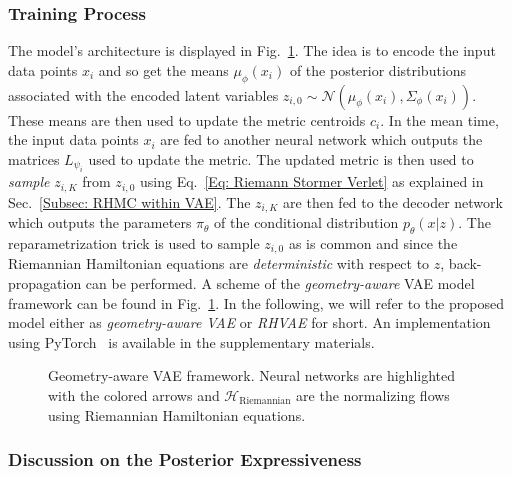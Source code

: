 \documentclass[10pt,journal,compsoc]{IEEEtran}
\begin{document}
    \subsubsection{Training Process}
    The model's architecture is displayed in Fig.~\ref{Fig: RHVAE framework}. The idea is to encode the input data points $x_i$ and so get the means $\mu_{\phi}(x_i)$ of the posterior distributions associated with the encoded latent variables $z_{i, 0} \sim \mathcal{N}(\mu_{\phi}(x_i), \Sigma_{\phi}(x_i))$. These means are then used to update the metric centroids $c_i$. In the mean time, the input data points $x_i$ are fed to another neural network which outputs the matrices $L_{\psi_i}$ used to update the metric. The updated metric is then used to \emph{sample} $z_{i,K} $ from $z_{i,0}$ using Eq.~\eqref{Eq: Riemann Stormer Verlet} as explained in Sec.~\ref{Subsec: RHMC within VAE}. The $z_{i,K}$ are then fed to the decoder network which outputs the parameters $\pi_{\theta}$ of the conditional distribution $p_{\theta}(x|z)$. The reparametrization trick is used to sample $z_{i,0}$ as is common and since the Riemannian Hamiltonian equations are \emph{deterministic} with respect to $z$, back-propagation can be performed. A scheme of the \emph{geometry-aware} VAE model framework can be found in Fig.~\ref{Fig: RHVAE framework}. In the following, we will refer to the proposed model either as \emph{geometry-aware VAE} or \emph{RHVAE} for short. An implementation using PyTorch~\cite{paszke_automatic_2017} is available in the supplementary materials.

    

    \begin{figure}[!t]
      \centering
      \caption{Geometry-aware VAE framework. Neural networks are highlighted with the colored arrows and $\mathcal{H}_{\mathrm{Riemannian}}$ are the normalizing flows using Riemannian Hamiltonian equations.}
      \label{Fig: RHVAE framework}
    \end{figure}

    \subsubsection{Discussion on the Posterior Expressiveness}
    
\end{document}
